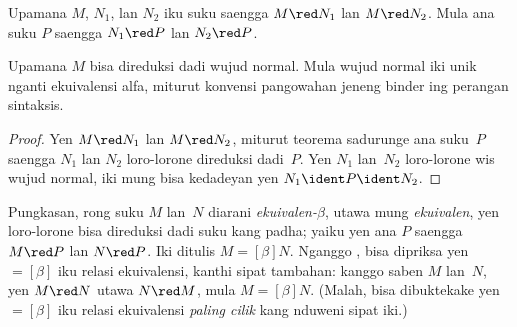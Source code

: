 \documentclass[../../../include/open-logic-section]{subfiles}
\begin{document}

\begin{thm}
Upamana $M$, $N_1$, lan $N_2$ iku suku
saengga $M \red N_1$ lan $M \red N_2$.
Mula ana suku $P$ saengga $N_1 \red P$
lan $N_2 \red P$.
\end{thm}

\begin{cor}
Upamana $M$ bisa direduksi dadi wujud normal.
Mula wujud normal iki unik nganti ekuivalensi alfa, miturut konvensi pangowahan jeneng binder ing perangan sintaksis.
\end{cor}

\begin{proof}
Yen $M \red N_1$ lan $M \red N_2$, miturut
teorema sadurunge ana suku~$P$ saengga
$N_1$ lan $N_2$ loro-lorone direduksi dadi~$P$.
Yen $N_1$ lan~$N_2$ loro-lorone wis wujud normal,
iki mung bisa kedadeyan yen
$N_1 \ident P \ident N_2$.
\end{proof}

Pungkasan, rong suku $M$ lan~$N$ diarani
\emph{ekuivalen-$\beta$}, utawa mung
\emph{ekuivalen}, yen loro-lorone bisa
direduksi dadi suku kang padha; yaiku
yen ana $P$ saengga $M \red P$ lan
$N \red P$. Iki ditulis $M \equal[\beta] N$.
Nganggo , bisa
dipriksa yen $\equal[\beta]$ iku relasi
ekuivalensi, kanthi sipat tambahan:
kanggo saben $M$ lan~$N$, yen $M \red N$
utawa $N \red M$, mula
$M \equal[\beta] N$. (Malah,
bisa dibuktekake yen $\equal[\beta]$
iku relasi ekuivalensi \emph{paling cilik}
kang nduweni sipat iki.)
\end{document}
